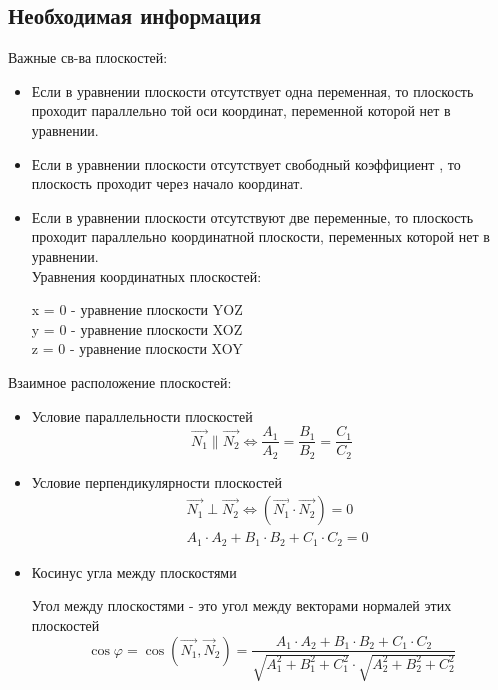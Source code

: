 \documentclass[a4paper,14pt]{extreport} %
\begin{document}
  \subsection{Необходимая информация}
      Важные св-ва плоскостей:
      \begin{itemize}
        \item Если в уравнении плоскости отсутствует одна переменная, то плоскость проходит параллельно той оси координат, переменной которой нет в уравнении.
        \item Если в уравнении плоскости отсутствует свободный коэффициент , то плоскость проходит через начало координат.
        \item Если в уравнении плоскости отсутствуют две переменные, то плоскость проходит параллельно координатной плоскости, переменных которой нет в уравнении.\\
          Уравнения координатных плоскостей:
          \begin{center}
          x = 0 - уравнение плоскости YOZ \\ 
          y = 0 - уравнение плоскости XOZ \\ 
          z = 0 - уравнение плоскости XOY \\
          \end{center}
      \end{itemize}
      Взаимное расположение плоскостей:
      \begin{itemize}
                \item Условие параллельности плоскостей
        $$
        \overrightarrow{N_1} \| \overrightarrow{N_2}  \Longleftrightarrow  \frac{A_1}{A_2}=\frac{B_1}{B_2}=\frac{C_1}{C_2}
        $$
        \item Условие перпендикулярности плоскостей
        $$
        \begin{array}{ll}
        &\overrightarrow{N_1} \perp \overrightarrow{N_2} \Leftrightarrow \left(\overrightarrow{N_1} \cdot \overrightarrow{N_2}\right)=0 \\

        & A_1 \cdot A_2+B_1 \cdot B_2+C_1 \cdot C_2=0
        \end{array}
        $$
        \item Косинус угла между плоскостями

        Угол между плоскостями - это угол между векторами нормалей этих плоскостей
        $$
        \cos \varphi=\cos \left(\overrightarrow{N_1}, \vec{N}_2\right)=\frac{A_1 \cdot A_2+B_1 \cdot B_2+C_1 \cdot C_2}{\sqrt{A_1^2+B_1^2+C_1^2} \cdot \sqrt{A_2^2+B_2^2+C_2^2}}
        $$
      \end{itemize}
\end{document}
